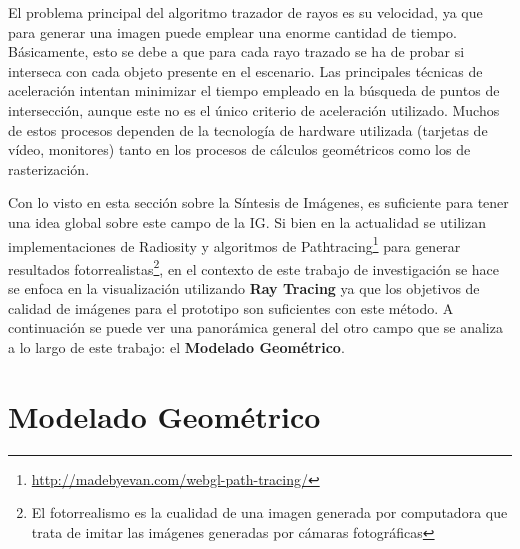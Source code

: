 

El problema principal del algoritmo trazador de rayos es su velocidad, ya que para generar una imagen puede emplear una enorme cantidad de tiempo. Básicamente, esto se debe a que para cada rayo trazado se ha de probar si interseca con cada objeto presente en el escenario. Las principales técnicas de aceleración intentan minimizar el tiempo empleado en la búsqueda de puntos de intersección, aunque este no es el único criterio de aceleración utilizado. Muchos de estos procesos dependen de la tecnología de hardware utilizada (tarjetas de vídeo, monitores) tanto en los procesos de cálculos geométricos como los de rasterización.


Con lo visto en esta sección sobre la Síntesis de Imágenes, es suficiente para tener una idea global sobre este campo de la IG. Si bien en la actualidad se utilizan implementaciones de Radiosity y algoritmos de Pathtracing\footnote{\url{http://madebyevan.com/webgl-path-tracing/}} para generar resultados fotorrealistas\footnote{El fotorrealismo es la cualidad de una imagen generada por computadora que trata de imitar las imágenes generadas por cámaras fotográficas}, en el contexto de este trabajo de investigación se hace se enfoca en la visualización utilizando \textbf{Ray Tracing} ya que los objetivos de calidad de imágenes para el prototipo son suficientes con este método. A continuación se puede ver una panorámica general del otro campo que se analiza a lo largo de este trabajo: el \textbf{Modelado Geométrico}.


\clearpage
\section{Modelado Geométrico}

